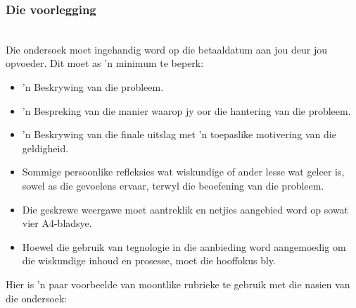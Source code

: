 \subsubsection{Die voorlegging}\\
Die ondersoek moet ingehandig word op die betaaldatum aan jou deur jou opvoeder. Dit moet as 'n minimum te beperk:
\begin{itemize}[noitemsep]
\item
  'n Beskrywing van die probleem.
\item
  'n Bespreking van die manier waarop jy oor die hantering van die probleem.
\item
  'n Beskrywing van die finale uitslag met 'n toepaslike motivering van die geldigheid.
\item
  Sommige persoonlike refleksies wat wiskundige of ander lesse wat geleer is, sowel as die gevoelens ervaar, terwyl die beoefening van die probleem.
\item
  Die geskrewe weergawe moet aantreklik en netjies aangebied word op sowat vier A4-bladsye.
\item
  Hoewel die gebruik van tegnologie in die aanbieding word aangemoedig om die wiskundige inhoud en prosesse, moet die hooffokus bly.
\end{itemize}	
Hier is 'n paar voorbeelde van moontlike rubrieke te gebruik met die nasien van die ondersoek:

